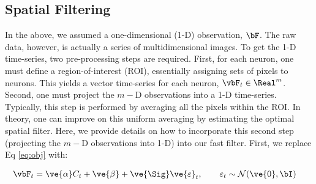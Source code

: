 
\subsection{Spatial Filtering}

In the above, we assumed a one-dimensional (1-D) observation, $\bF$.  The raw data, however, is actually a series of multidimensional images. To get the 1-D time-series, two pre-processing steps are required.  First, for each neuron, one must define a region-of-interest (ROI), essentially assigning sets of pixels to neurons. This yields a vector time-series for each neuron, $\vbF_t \in \Real^m$.   Second, one must project the $m-$D observations into a 1-D time-series.  Typically, this step is performed by averaging all the pixels within the ROI.  In theory, one can improve on this uniform averaging by estimating the optimal spatial filter. Here, we provide details on how to incorporate this second step (projecting the $m-$D observations into 1-D) into our fast filter. First, we replace Eq \eqref{eq:obj} with:

\begin{align}
\vbF_t &= \ve{\alpha} C_t + \ve{\beta} +  \ve{\Sig} \ve{\varepsilon}_t, \qquad \varepsilon_t \sim \mathcal{N}(\ve{0},\bI) \label{eq:Obs} 
\end{align}

